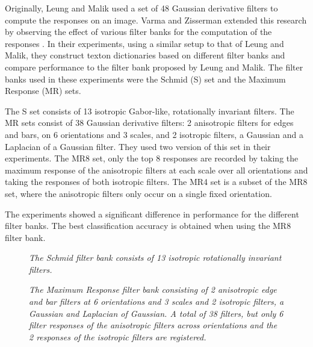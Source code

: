 Originally, Leung and Malik used a set of 48 Gaussian derivative filters to compute the responses on an image. Varma and Zisserman extended this research by observing the effect of various filter banks for the computation of the responses \cite{VarmaZisserman}. In their experiments, using a similar setup to that of Leung and Malik, they construct texton dictionaries based on different filter banks and compare performance to the filter bank proposed by Leung and Malik. The filter banks used in these experiments were the Schmid (S) set and the Maximum Response (MR) sets. 

The S set consists of 13 isotropic Gabor-like, rotationally invariant filters. The MR sets consist of 38 Gaussian derivative filters: 2 anisotropic filters for edges and bars, on 6 orientations and 3 scales, and 2 isotropic filters, a Gaussian and a Laplacian of a Gaussian filter. They used two version of this set in their experiments. The MR8 set, only the top 8 responses are recorded by taking the maximum response of the anisotropic filters at each scale over all orientations and taking the responses of both isotropic filters. The MR4 set is a subset of the MR8 set, where the anisotropic filters only occur on a single fixed orientation.

The experiments showed a significant difference in performance for the different filter banks. The best classification accuracy is obtained when using the MR8 filter bank.

\begin{figure}[t]
	\begin{center}
	\end{center}
	\caption{\textit{The Schmid filter bank consists of 13 isotropic rotationally invariant filters.}}
	\label{fig:S}
\end{figure}

\begin{figure}[b]
	\begin{center}
	\end{center}
	\caption{\textit{The Maximum Response filter bank consisting of 2 anisotropic edge and bar filters at 6 orientations and 3 scales and 2 isotropic filters, a Gaussian and Laplacian of Gaussian. A total of 38 filters, but only 6 filter responses of the anisotropic filters across orientations and the 2 responses of the isotropic filters are registered.}}
	\label{fig:MR}
\end{figure}

